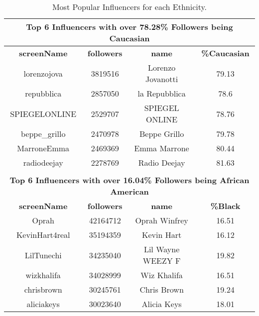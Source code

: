 \begin{table}
\small
\caption[Top Influencers for each Ethnicity]{Most Popular Influencers for each Ethnicity.}
\label{table_6_app2}
\begin{center}
\begin{tabular}{|c|c|c|c|}
\multicolumn{4}{c}{\bfseries Top 6 Influencers with over 78.28\% Followers being Caucasian}\\
\hline
\bfseries screenName & \bfseries followers & \bfseries name & \bfseries {\%}Caucasian\\
\hline
lorenzojova & 3819516 & Lorenzo Jovanotti & 79.13 \\
\hline
repubblica & 2857050 & la Repubblica & 78.6 \\
\hline
SPIEGELONLINE & 2529707 & SPIEGEL ONLINE & 78.76 \\
\hline
beppe{\_}grillo & 2470978 & Beppe Grillo & 79.78 \\
\hline
MarroneEmma & 2469369 & Emma Marrone & 80.44 \\
\hline
radiodeejay & 2278769 & Radio Deejay & 81.63 \\
\hline
\multicolumn{4}{c}{}\\
\multicolumn{4}{c}{\bfseries Top 6 Influencers with over 16.04\% Followers being African American}\\
\hline
\bfseries screenName & \bfseries followers & \bfseries name & \bfseries {\%}Black\\
\hline
Oprah & 42164712 & Oprah Winfrey & 16.51 \\
\hline
KevinHart4real & 35194359 & Kevin Hart & 16.12 \\
\hline
LilTunechi & 34235040 & Lil Wayne WEEZY F & 19.82 \\
\hline
wizkhalifa & 34028999 & Wiz Khalifa & 16.51 \\
\hline
chrisbrown & 30245761 & Chris Brown & 19.24 \\
\hline
aliciakeys & 30023640 & Alicia Keys & 18.01 \\

\end{tabular}
\end{center}
\end{table}
